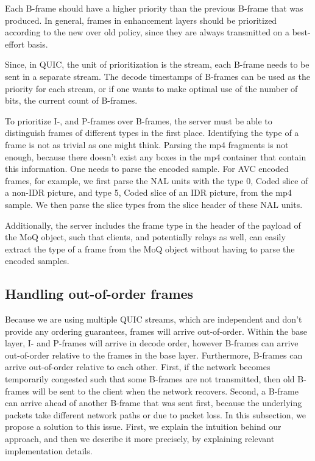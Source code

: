 Each B-frame should have a higher priority than the previous B-frame that was produced. In general, frames in enhancement layers should be prioritized according to the new over old policy, since they are always transmitted on a best-effort basis. 

Since, in QUIC, the unit of prioritization is the stream, each B-frame needs to be sent in a separate stream. The decode timestamps of B-frames can be used as the priority for each stream, or if one wants to make optimal use of the number of bits, the current count of B-frames.

To prioritize I-, and P-frames over B-frames, the server must be able to distinguish frames of different types in the first place. Identifying the type of a frame is not as trivial as one might think. Parsing the mp4 fragments is not enough, because there doesn't exist any boxes in the mp4 container that contain this information. One needs to parse the encoded sample. For AVC encoded frames, for example, we first parse the \ac{NAL} units with the type 0, Coded slice of a non-IDR picture, and type 5, Coded slice of an IDR picture, from the mp4 sample. We then parse the slice types from the slice header of these NAL units.

Additionally, the server includes the frame type in the header of the payload of the MoQ object, such that clients, and potentially relays as well, can easily extract the type of a frame from the MoQ object without having to parse the encoded samples.

\subsection{Handling out-of-order frames}\label{section:out_of_order_frames}
Because we are using multiple QUIC streams, which are independent and don't provide any ordering guarantees, frames will arrive out-of-order. Within the base layer, I- and P-frames will arrive in decode order, however B-frames can arrive out-of-order relative to the frames in the base layer. Furthermore, B-frames can arrive out-of-order relative to each other. First, if the network becomes temporarily congested such that some B-frames are not transmitted, then old B-frames will be sent to the client when the network recovers. Second, a B-frame can arrive ahead of another B-frame that was sent first, because the underlying packets take different network paths or due to packet loss. %
In this subsection, we propose a solution to this issue. First, we explain the intuition behind our approach, and then we describe it more precisely, by explaining relevant implementation details.

